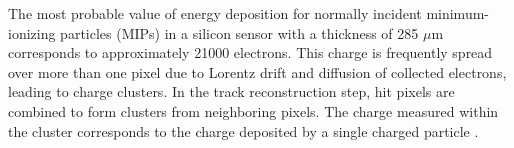 The most probable value of energy deposition for normally incident minimum-ionizing particles (MIPs) in a silicon sensor with a thickness of 285 $\mu \text{m}$ corresponds to approximately 21000 electrons. This charge is frequently spread over more than one pixel due to Lorentz drift and diffusion of collected electrons, leading to charge clusters. In the track reconstruction step, hit pixels are combined to form clusters from neighboring pixels. The charge measured within the cluster corresponds to the charge deposited by a single charged particle \cite{phase1_Pixel_Detector}. \\
